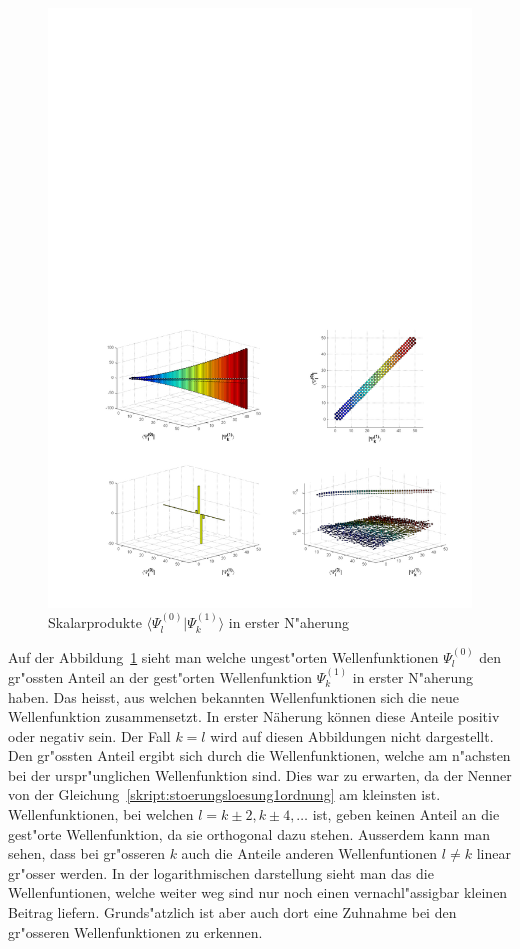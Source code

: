 \begin{refsection}
\begin{figure}[h]	%
\centering
\includegraphics[width=1.0\textwidth]{anharmonisch/images/x3/Stoerung1Skalare.pdf}
\caption{Skalarprodukte $\langle\Psi_l^{(0)}|\Psi_k^{(1)}\rangle$ in erster N"aherung
\label{skript:x3_Stoerung1Skalare}}
\end{figure}

Auf der Abbildung~\ref{skript:x3_Stoerung1Skalare} sieht man welche ungest"orten Wellenfunktionen $\Psi_l^{(0)}$ den gr"ossten Anteil an der gest"orten Wellenfunktion $\Psi_k^{(1)}$ in erster N"aherung haben. Das heisst, aus welchen bekannten Wellenfunktionen sich die neue Wellenfunktion zusammensetzt. In erster Näherung können diese Anteile positiv oder negativ sein. Der Fall $k=l$ wird auf diesen Abbildungen nicht dargestellt. Den gr"ossten Anteil ergibt sich durch die Wellenfunktionen, welche am n"achsten bei der urspr"unglichen Wellenfunktion sind. Dies war zu erwarten, da der Nenner von der Gleichung~\ref{skript:stoerungsloesung1ordnung} am kleinsten ist. Wellenfunktionen, bei welchen $l=k\pm 2,k\pm 4,\dots$ ist, geben keinen Anteil an die gest"orte Wellenfunktion, da sie orthogonal dazu stehen. Ausserdem kann man sehen, dass bei gr"osseren $k$ auch die Anteile anderen Wellenfuntionen $l\neq k$ linear gr"osser werden. In der logarithmischen darstellung sieht man das die Wellenfuntionen, welche weiter weg sind nur noch einen vernachl"assigbar kleinen Beitrag liefern. Grunds"atzlich ist aber auch dort eine Zuhnahme bei den gr"osseren Wellenfunktionen zu erkennen.



\end{refsection}
